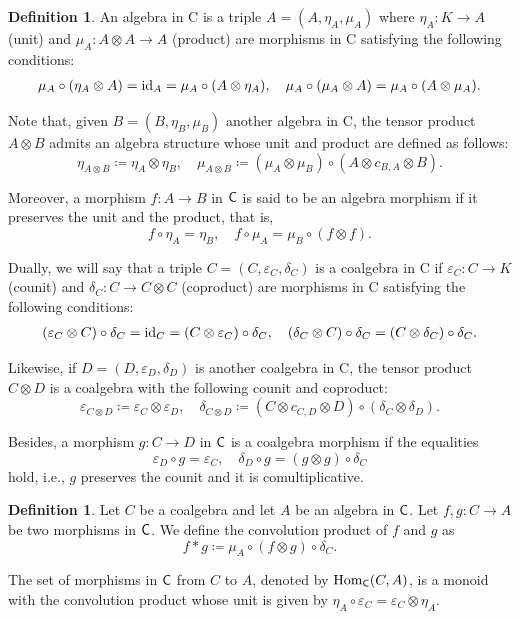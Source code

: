 \documentclass[11pt,reqno]{amsart}
\theoremstyle{plain}%
\theoremstyle{definition}
\newtheorem{definition}[theorem]{Definition}%
\theoremstyle{remark}
\begin{document}
\begin{definition}
An algebra in {\sf C} is a triple $A=(A,\eta_{A},\mu_{A})$ where $\eta_{A}\colon K\rightarrow A$ (unit) and $\mu_{A}\colon A\otimes A\rightarrow A$ (product) are morphisms in {\sf C} satisfying the following conditions:
\begin{gather*}
\mu_{A}\circ (\eta_{A}\otimes A)={\rm id}_{A}=\mu_{A}\circ(A\otimes\eta_{A}),\quad\mu_{A}\circ(\mu_{A}\otimes A)=\mu_{A}\circ(A\otimes\mu_{A}).
\end{gather*}
	
Note that, given $B=(B,\eta_{B},\mu_{B})$ another algebra in {\sf C}, the tensor product $A\otimes B$ admits an algebra structure whose unit and product are defined as follows:
$$
\eta_{A\otimes B}\coloneqq \eta_{A}\otimes\eta_{B}, \quad
\mu_{A\otimes B}\coloneqq (\mu_{A}\otimes\mu_{B})\circ(A\otimes c_{B,A}\otimes B).
$$
	
Moreover, a morphism $f\colon A\rightarrow B$ in ${\sf C}$ is said to be an algebra morphism if it preserves the unit and the product, that is,
$$
f\circ\eta_{A}=\eta_{B}, \quad f\circ\mu_{A}=\mu_{B}\circ(f\otimes f).
$$
	
Dually, we will say that a triple $C=(C,\varepsilon_{C},\delta_{C})$ is a coalgebra in {\sf C} if  $\varepsilon_{C}\colon C\rightarrow K$ (counit) and $\delta_{C}\colon C\rightarrow C\otimes C$ (coproduct) are morphisms in {\sf C} satisfying the following conditions:
\begin{gather*}
(\varepsilon_{C}\otimes C)\circ\delta_{C}={\rm id}_{C}=(C\otimes\varepsilon_{C})\circ\delta_{C},\quad(\delta_{C}\otimes C)\circ\delta_{C}=(C\otimes\delta_{C})\circ\delta_{C}.
\end{gather*}
	
Likewise, if $D=(D,\varepsilon_{D},\delta_{D})$ is another coalgebra in {\sf C}, the tensor product $C\otimes D$ is a coalgebra with the following counit and coproduct:
$$
\varepsilon_{C\otimes D}\coloneqq\varepsilon_{C}\otimes\varepsilon_{D},\quad
\delta_{C\otimes D}\coloneqq(C\otimes c_{C,D}\otimes D)\circ(\delta_{C}\otimes\delta_{D}).
$$
	
Besides, a morphism $g\colon C\rightarrow D$ in ${\sf C}$ is a coalgebra morphism if the equalities
$$
\varepsilon_{D}\circ g=\varepsilon_{C}, \quad\delta_{D}\circ g=(g\otimes g)\circ\delta_{C}
$$
hold, i.e., $g$ preserves the counit and it is comultiplicative.
\end{definition}

\begin{definition}
Let $C$ be a coalgebra and let $A$ be an algebra in ${\sf C}$. Let $f,g:C\rightarrow A$ be two morphisms in ${\sf C}$. We define the convolution product of $f$ and $g$ as 
\[f\ast g\coloneqq\mu_{A}\circ (f\otimes g)\circ\delta_{C}.\]

The set of morphisms in ${\sf C}$ from $C$ to $A$, denoted by $\operatorname{Hom}_{{\sf C}}(C,A)$, is a monoid with the convolution product whose unit is given by $\eta_{A}\circ\varepsilon_{C}=\varepsilon_{C}\otimes\eta_{A}$.
\end{definition}
\end{document}
